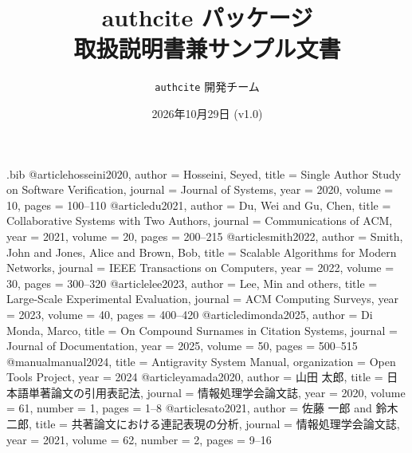 \begin{filecontents*}{\jobname.bib}
@article{hosseini2020,
  author  = {Hosseini, Seyed},
  title   = {Single Author Study on Software Verification},
  journal = {Journal of Systems},
  year    = {2020},
  volume  = {10},
  pages   = {100--110}
}
@article{du2021,
  author  = {Du, Wei and Gu, Chen},
  title   = {Collaborative Systems with Two Authors},
  journal = {Communications of ACM},
  year    = {2021},
  volume  = {20},
  pages   = {200--215}
}
@article{smith2022,
  author  = {Smith, John and Jones, Alice and Brown, Bob},
  title   = {Scalable Algorithms for Modern Networks},
  journal = {IEEE Transactions on Computers},
  year    = {2022},
  volume  = {30},
  pages   = {300--320}
}
@article{lee2023,
  author  = {Lee, Min and others},
  title   = {Large-Scale Experimental Evaluation},
  journal = {ACM Computing Surveys},
  year    = {2023},
  volume  = {40},
  pages   = {400--420}
}
@article{dimonda2025,
  author  = {Di Monda, Marco},
  title   = {On Compound Surnames in Citation Systems},
  journal = {Journal of Documentation},
  year    = {2025},
  volume  = {50},
  pages   = {500--515}
}
@manual{manual2024,
  title        = {Antigravity System Manual},
  organization = {Open Tools Project},
  year         = {2024}
}
@article{yamada2020,
  author  = {山田 太郎},
  title   = {日本語単著論文の引用表記法},
  journal = {情報処理学会論文誌},
  year    = {2020},
  volume  = {61},
  number  = {1},
  pages   = {1--8}
}
@article{sato2021,
  author  = {佐藤 一郎 and 鈴木 二郎},
  title   = {共著論文における連記表現の分析},
  journal = {情報処理学会論文誌},
  year    = {2021},
  volume  = {62},
  number  = {2},
  pages   = {9--16}
}
\end{filecontents*}

\documentclass[uplatex]{jsarticle}
\usepackage[dvipdfmx]{graphicx}
\usepackage{authcite}
\usepackage{url}

\title{\textsf{authcite} パッケージ\\取扱説明書兼サンプル文書}
\author{\texttt{authcite} 開発チーム}
\date{2026年10月29日 (v1.0)}


\maketitle

\begin{abstract}
\textsf{authcite} は，\LaTeX において文献参照コマンド \verb|\cite| の直前に著者名（姓）を自動付与するパッケージです．
手動で「〇〇ら」と入力する手間を省き，文献データベース（Bib\TeX）から著者数や姓を正確に抽出して整形します．
日本語（「〜ら」「〜と〜」）および英語（「\textit{et al.}」「and」）の両方に対応し，2人共著の表記（省略または連記）も柔軟に切り替え可能です．
\end{abstract}

